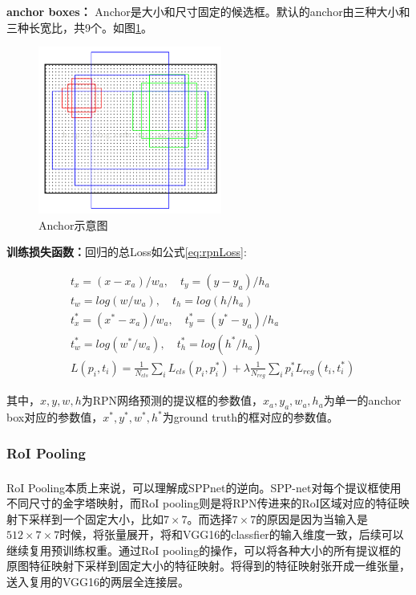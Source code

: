 \documentclass[12pt,a4paper,titlepage]{article}
\newcommand{\upcite}[1]{\textsuperscript{\textsuperscript{\cite{#1}}}}  %
\begin{document}
\textbf{anchor boxes：}
Anchor是大小和尺寸固定的候选框。默认的anchor由三种大小和三种长宽比，共9个。如图\ref{fig:anchorbox}。
\begin{figure}[h]
\centering
\includegraphics[height=5.5cm]{img/anchorbox.png}
\caption{Anchor示意图}
\label{fig:anchorbox}
\end{figure}

\textbf{训练损失函数：}回归的总Loss如公式\ref{eq:rpnLoss}:

\begin{equation}\label{eq:rpnLoss}
\begin{split}
& t_x = (x-x_a)/w_a,\quad t_y = (y-y_a)/h_a \\
& t_w = log(w/w_a),\quad t_h = log(h/h_a) \\
& t_x^* = (x^*-x_a)/w_a,\quad t_y^* = (y^*-y_a)/h_a\\
& t_w^* = log(w^*/w_a),\quad t_h^* = log(h^*/h_a) \\
& L({p_i},{t_i}) = \frac{1}{N_{cls}}\sum_iL_{cls}(p_i,p_i^*) + \lambda\frac{1}{N_{reg}}\sum_ip_i^*L_{reg}(t_i,t_i^*)
\end{split}
\end{equation}

其中，$x,y,w,h$为RPN网络预测的提议框的参数值，$x_a,y_a,w_a,h_a$为单一的anchor box对应的参数值，$x^*,y^*,w^*,h^*$为ground truth的框对应的参数值。

\subsubsection{RoI Pooling}
RoI Pooling本质上来说，可以理解成SPPnet\upcite{he2014spatial}的逆向。SPP-net对每个提议框使用不同尺寸的金字塔映射，而RoI pooling则是将RPN传进来的RoI区域对应的特征映射下采样到一个固定大小，比如$7\times 7$。而选择$7\times 7$的原因是因为当输入是$512\times7\times7$时候，将张量展开，将和VGG16的classfier的输入维度一致，后续可以继续复用预训练权重。通过RoI pooling的操作，可以将各种大小的所有提议框的原图特征映射下采样到固定大小的特征映射。将得到的特征映射张开成一维张量，送入复用的VGG16的两层全连接层。
\end{document}
